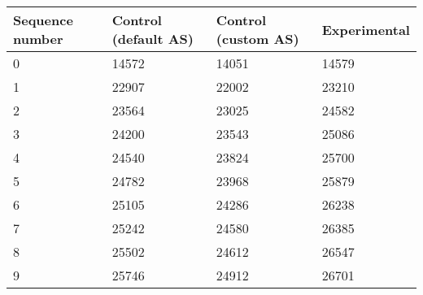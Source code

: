 \begin{center}
\begin{tabular}{|l|l|l|l|}
\hline
Sequence number & Control (default AS) & Control (custom AS) & Experimental \\
\hline
0 & 14572 & 14051 & 14579 \\
1 & 22907 & 22002 & 23210 \\
2 & 23564 & 23025 & 24582 \\
3 & 24200 & 23543 & 25086 \\
4 & 24540 & 23824 & 25700 \\
5 & 24782 & 23968 & 25879 \\
6 & 25105 & 24286 & 26238 \\
7 & 25242 & 24580 & 26385 \\
8 & 25502 & 24612 & 26547 \\
9 & 25746 & 24912 & 26701 \\
\hline
\end{tabular}
\end{center}

